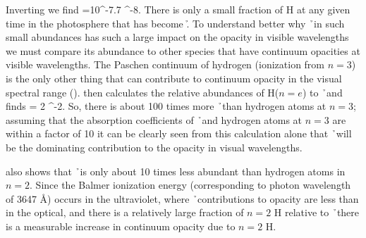 Inverting we find 
\beq
{}=10^{-7.7}  ^{-8}.
\eeq
There is only a small fraction of H at any given time in the
photosphere that has become \h.  To understand better why \h\ in such
small abundances has such a large impact on the opacity in visible
wavelengths we must compare its abundance to other species that have
continuum opacities at visible wavelengths.  The Paschen continuum of
hydrogen (ionization from $n=3$) is the only other thing that can contribute
to continuum opacity in the visual spectral range
(\citealt{boehm1989}).  \cite{boehm1989} then calculates the relative
abundances of H($n=e$) to \h\ and finds
\beq
{} = 2 ^{-2}.
\eeq
So, there is about 100 times more \h\ than hydrogen atoms at $n=3$;
assuming that the absorption coefficients of \h\ and  hydrogen atoms
at $n=3$ are within a factor of 10 it can be clearly seen from this
calculation alone that \h\ will be the dominating contribution to the
opacity in visual wavelengths.

\cite{boehm1989} also shows that \h\ is only about 10 times less abundant than hydrogen atoms in $n=2$.  Since the Balmer ionization energy (corresponding to photon wavelength of 3647 \AA) occurs in the ultraviolet, where \h\ contributions to opacity are less than in the optical, and there is a relatively large fraction of $n=2$ H relative to \h\ there is a measurable increase in continuum opacity due to $n=2$ H.  %
